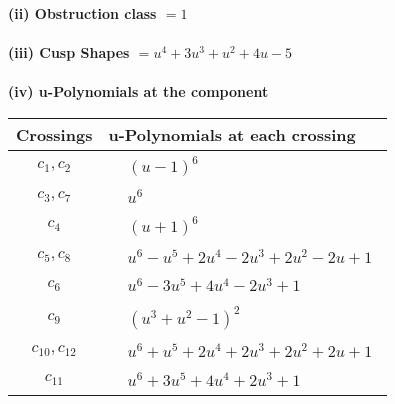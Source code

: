 \documentclass[1p]{elsarticle_modified}
\theoremstyle{definition}
\begin{document}
\flushleft \textbf{(ii) Obstruction class $= 1$}\\~\\
\flushleft \textbf{(iii) Cusp Shapes $= u^4+3 u^3+u^2+4 u-5$}\\~\\
\newpage\renewcommand{\arraystretch}{1}
\flushleft \textbf{(iv) u-Polynomials at the component}\newline \\
\begin{tabular}{m{50pt}|m{274pt}}
Crossings & \hspace{64pt}u-Polynomials at each crossing \\
\hline $$\begin{aligned}c_{1},c_{2}\end{aligned}$$&$\begin{aligned}
&(u-1)^6
\end{aligned}$\\
\hline $$\begin{aligned}c_{3},c_{7}\end{aligned}$$&$\begin{aligned}
&u^6
\end{aligned}$\\
\hline $$\begin{aligned}c_{4}\end{aligned}$$&$\begin{aligned}
&(u+1)^6
\end{aligned}$\\
\hline $$\begin{aligned}c_{5},c_{8}\end{aligned}$$&$\begin{aligned}
&u^6- u^5+2 u^4-2 u^3+2 u^2-2 u+1
\end{aligned}$\\
\hline $$\begin{aligned}c_{6}\end{aligned}$$&$\begin{aligned}
&u^6-3 u^5+4 u^4-2 u^3+1
\end{aligned}$\\
\hline $$\begin{aligned}c_{9}\end{aligned}$$&$\begin{aligned}
&(u^3+u^2-1)^2
\end{aligned}$\\
\hline $$\begin{aligned}c_{10},c_{12}\end{aligned}$$&$\begin{aligned}
&u^6+u^5+2 u^4+2 u^3+2 u^2+2 u+1
\end{aligned}$\\
\hline $$\begin{aligned}c_{11}\end{aligned}$$&$\begin{aligned}
&u^6+3 u^5+4 u^4+2 u^3+1
\end{aligned}$\\
\hline
\end{tabular}\\~\\
\end{document}
